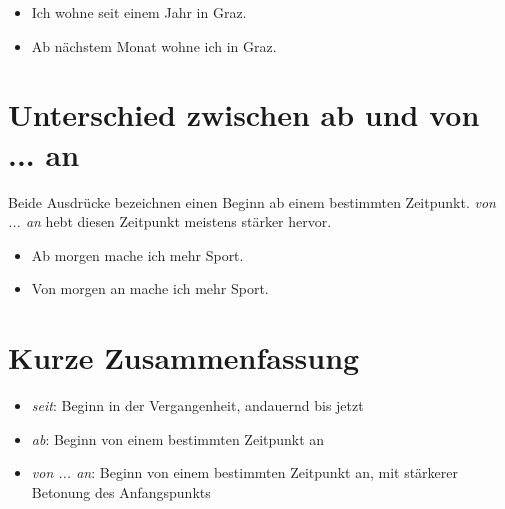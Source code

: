 \documentclass[a4paper]{article}
\begin{document}
        \begin{itemize}
            \item Ich wohne seit einem Jahr in Graz.
            \item Ab nächstem Monat wohne ich in Graz.
        \end{itemize}
    
    
    \section{Unterschied zwischen ab und von ... an}
        Beide Ausdrücke bezeichnen einen Beginn ab einem bestimmten Zeitpunkt.
        \textit{von ... an} hebt diesen Zeitpunkt meistens stärker hervor.
        
        \begin{itemize}
            \item Ab morgen mache ich mehr Sport.
            \item Von morgen an mache ich mehr Sport.
        \end{itemize}
    
    
    \section{Kurze Zusammenfassung}
        \begin{itemize}
            \item \textit{seit}: Beginn in der Vergangenheit, andauernd bis jetzt
            \item \textit{ab}: Beginn von einem bestimmten Zeitpunkt an
            \item \textit{von ... an}: Beginn von einem bestimmten Zeitpunkt an, mit stärkerer Betonung des Anfangspunkts
        \end{itemize}
    
\end{document}
